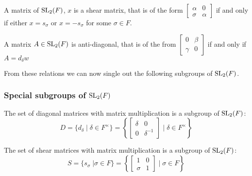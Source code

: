 \begin{remark}
    \label{SpecialLinearGroup.fin_two_shear_iff}
    \leanok
    A matrix of $\operatorname{SL}_2(F)$, $x$ is a shear matrix, that is of the form $\begin{bmatrix}
        \alpha & 0\\
        \sigma & \alpha
    \end{bmatrix}$ if and only if either $x = s_\sigma$ or $x = - s_\sigma$ for some $\sigma \in F$.
\end{remark}

\begin{remark}
    \label{SpecialLinearGroup.fin_two_antidiagonal_iff}
    \leanok
    A matrix $A \in \operatorname{SL}_2(F)$ is anti-diagonal, that is of the from $\begin{bmatrix}
        0 & \beta\\
        \gamma & 0
    \end{bmatrix}$ if and only if $A = d_\delta w$
    
\end{remark}

From these relations we can now single out the following subgroups of $\operatorname{SL}_2(F)$.

\subsubsection{Special subgroups of $\operatorname{SL}_2(F)$}

\begin{definition}
\label{SpecialSubgroups.D}
\leanok
    The set of diagonal matrices with matrix multiplication is a subgroup of $\operatorname{SL}_2(F)$: 
    \[
    D = \{d_\delta \; | \; \delta \in F^\times \} = \left\{ \begin{bmatrix}\delta & 0\\ 0 & \delta^{-1}\end{bmatrix} \; | \; \delta \in F^\times \right\}
    \]
\end{definition}

\begin{definition}
\label{SpecialSubgroups.S}
\leanok
    The set of shear matrices with matrix multiplication is a subgroup of $\operatorname{SL}_2(F)$:
    \[
    S = \{s_\sigma \; | \sigma \in F\} = \left\{\begin{bmatrix}1 & 0\\ \sigma & 1\end{bmatrix} \; | \; \sigma \in F \right\}
    \]
\end{definition}

